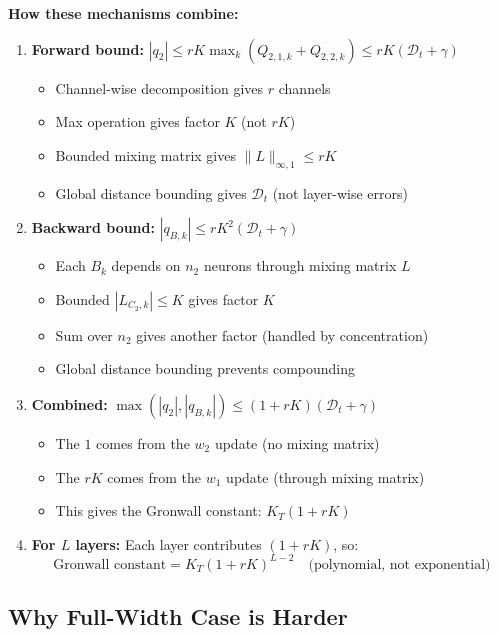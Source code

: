 \textbf{How these mechanisms combine:}

\begin{enumerate}
\item \textbf{Forward bound:} $|q_2| \le rK \max_k(Q_{2,1,k} + Q_{2,2,k}) \le rK(\mathscr{D}_t + \gamma)$
   \begin{itemize}
   \item Channel-wise decomposition gives $r$ channels
   \item Max operation gives factor $K$ (not $rK$)
   \item Bounded mixing matrix gives $\|L\|_{\infty,1} \le rK$
   \item Global distance bounding gives $\mathscr{D}_t$ (not layer-wise errors)
   \end{itemize}

\item \textbf{Backward bound:} $|q_{B,k}| \le rK^2(\mathscr{D}_t + \gamma)$
   \begin{itemize}
   \item Each $B_k$ depends on $n_2$ neurons through mixing matrix $L$
   \item Bounded $|L_{C_2,k}| \le K$ gives factor $K$
   \item Sum over $n_2$ gives another factor (handled by concentration)
   \item Global distance bounding prevents compounding
   \end{itemize}

\item \textbf{Combined:} $\max(|q_2|, |q_{B,k}|) \le (1+rK)(\mathscr{D}_t + \gamma)$
   \begin{itemize}
   \item The $1$ comes from the $w_2$ update (no mixing matrix)
   \item The $rK$ comes from the $w_1$ update (through mixing matrix)
   \item This gives the Gronwall constant: $K_T(1+rK)$
   \end{itemize}

\item \textbf{For $L$ layers:} Each layer contributes $(1+rK)$, so:
   \[
   \text{Gronwall constant} = K_T(1+rK)^{L-2} \quad \text{(polynomial, not exponential)}
   \]
\end{enumerate}

\subsection{Why Full-Width Case is Harder}


